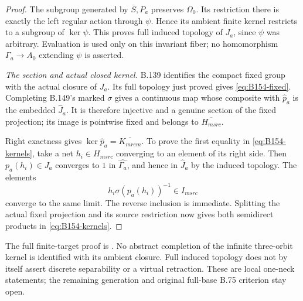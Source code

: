 \begin{proof}
The subgroup generated by $\overline S,P_a$ preserves $\Omega_0$.
Its restriction there is exactly the left regular action through
$\psi$. Hence its ambient finite kernel restricts to a subgroup of
$\ker\psi$. This proves full induced topology of $J_a$, since $\psi$
was arbitrary. Evaluation is used only on this invariant fiber;
no homomorphism $\Gamma_a\to A_0$ extending $\psi$ is asserted.

\emph{The section and actual closed kernel.}
B.139 identifies the compact fixed group with the actual closure of
$J_a$. Its full topology just proved gives \eqref{eq:B154-fixed}.
Completing B.149's marked $\sigma$ gives a continuous map whose
composite with $\widehat p_a$ is the embedded $\widehat J_a$.
It is therefore injective and a genuine section of the fixed
projection; its image is pointwise fixed and belongs to
$\overline{H_{
m src}}$.

Right exactness gives
$\ker\widehat p_a=\overline{K_{
m rem}}$.
To prove the first equality in \eqref{eq:B154-kernels}, take a net
$h_i\in H_{
m src}$ converging to an element of its right side.
Then $p_a(h_i)\in J_a$ converges to $1$ in
$\widehat{\Gamma_a}$, and hence in $\widehat J_a$ by the induced
topology. The elements
\[
 h_i\sigma(p_a(h_i))^{-1}\in I_{
m src}
\]
converge to the same limit. The reverse inclusion is immediate.
Splitting the actual fixed projection and its source restriction now
gives both semidirect products in \eqref{eq:B154-kernels}.
\end{proof}
The full finite-target proof is
.
No abstract completion of the infinite three-orbit kernel is identified
with its ambient closure. Full induced topology does not by itself
assert discrete separability or a virtual retraction. These are local
one-neck statements; the remaining generation and original full-base
B.75 criterion stay open.
